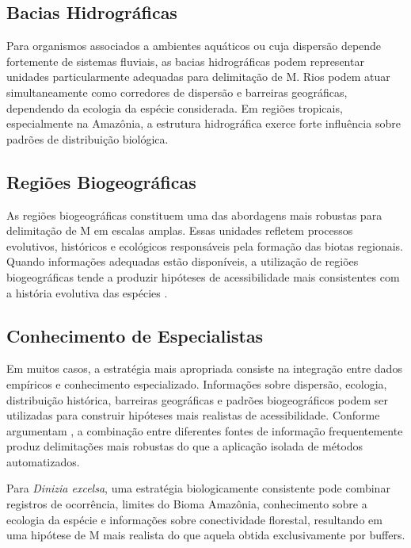 \subsection{Bacias Hidrográficas}

Para organismos associados a ambientes aquáticos ou cuja dispersão depende fortemente de sistemas fluviais, as bacias hidrográficas podem representar unidades particularmente adequadas para delimitação de M. Rios podem atuar simultaneamente como corredores de dispersão e barreiras geográficas, dependendo da ecologia da espécie considerada. Em regiões tropicais, especialmente na Amazônia, a estrutura hidrográfica exerce forte influência sobre padrões de distribuição biológica.

\subsection{Regiões Biogeográficas}

As regiões biogeográficas constituem uma das abordagens mais robustas para delimitação de M em escalas amplas. Essas unidades refletem processos evolutivos, históricos e ecológicos responsáveis pela formação das biotas regionais. Quando informações adequadas estão disponíveis, a utilização de regiões biogeográficas tende a produzir hipóteses de acessibilidade mais consistentes com a história evolutiva das espécies \parencite{Morrone2015,Peterson2011}.

\subsection{Conhecimento de Especialistas}

Em muitos casos, a estratégia mais apropriada consiste na integração entre dados empíricos e conhecimento especializado. Informações sobre dispersão, ecologia, distribuição histórica, barreiras geográficas e padrões biogeográficos podem ser utilizadas para construir hipóteses mais realistas de acessibilidade. Conforme argumentam \textcite{Barve2011}, a combinação entre diferentes fontes de informação frequentemente produz delimitações mais robustas do que a aplicação isolada de métodos automatizados.

\begin{applicationbox}
	Para \textit{Dinizia excelsa}, uma estratégia biologicamente consistente pode combinar registros de ocorrência, limites do Bioma Amazônia, conhecimento sobre a ecologia da espécie e informações sobre conectividade florestal, resultando em uma hipótese de M mais realista do que aquela obtida exclusivamente por buffers.
\end{applicationbox}


